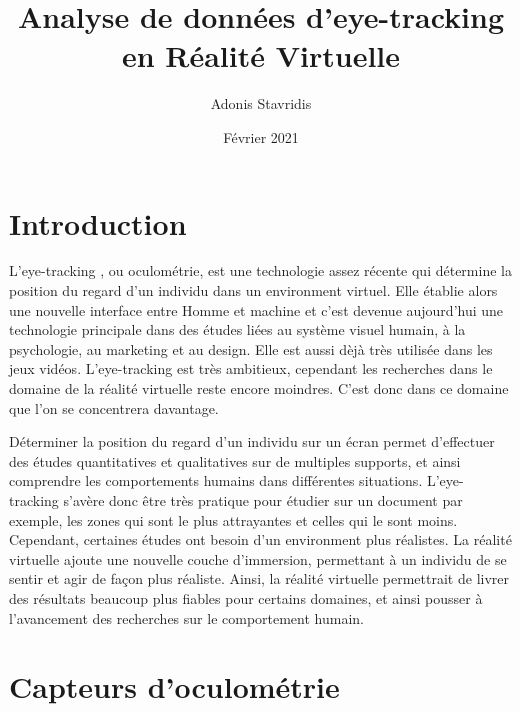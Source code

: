 \documentclass[12pt]{article}
\title{\textbf{Analyse de données d’eye-tracking en Réalité Virtuelle}}
\author{\Large{Adonis Stavridis}}
\date{Février 2021}
\begin{document}

\maketitle
\tableofcontents
\pagebreak


\section{Introduction}
L'eye-tracking \cite{wiki:eye_tracking}, ou oculométrie, est une technologie
assez récente qui détermine la position du regard d'un individu dans un
environment virtuel. Elle établie alors une nouvelle interface entre Homme et
machine et c'est devenue aujourd'hui une technologie principale dans des études
liées au système visuel humain, à la psychologie, au marketing et au design.
Elle est aussi dèjà très utilisée dans les jeux vidéos. L'eye-tracking est très
ambitieux, cependant les recherches dans le domaine de la réalité virtuelle
reste encore moindres. C'est donc dans ce domaine que l'on se concentrera
davantage.

\bigskip
Déterminer la position du regard d'un individu sur un écran permet d'effectuer
des études quantitatives et qualitatives sur de multiples supports, et ainsi
comprendre les comportements humains dans différentes situations. L'eye-tracking
s'avère donc être très pratique pour étudier sur un document par exemple, les
zones qui sont le plus attrayantes et celles qui le sont moins. Cependant,
certaines études ont besoin d'un environment plus réalistes. La réalité
virtuelle ajoute une nouvelle couche d'immersion, permettant à un individu de
se sentir et agir de façon plus réaliste. Ainsi, la réalité virtuelle
permettrait de livrer des résultats beaucoup plus fiables pour certains
domaines, et ainsi pousser à l'avancement des recherches sur le comportement
humain.


\section{Capteurs d'oculométrie}
\end{document}
